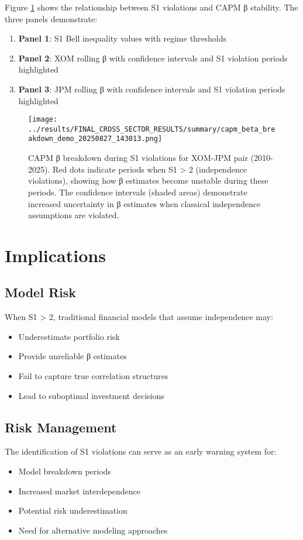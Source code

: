 \documentclass[11pt,a4paper]{article}
\begin{document}
Figure \ref{fig:capm_breakdown} shows the relationship between S1 violations and CAPM β stability. The three panels demonstrate:

\begin{enumerate}
\item \textbf{Panel 1}: S1 Bell inequality values with regime thresholds
\item \textbf{Panel 2}: XOM rolling β with confidence intervals and S1 violation periods highlighted
\item \textbf{Panel 3}: JPM rolling β with confidence intervals and S1 violation periods highlighted
\end{enumerate}

\begin{figure}[H]
\centering
\texttt{[image: ../results/FINAL\_CROSS\_SECTOR\_RESULTS/summary/capm\_beta\_breakdown\_demo\_20250827\_143013.png]}
\caption{CAPM β breakdown during S1 violations for XOM-JPM pair (2010-2025). Red dots indicate periods when S1 > 2 (independence violations), showing how β estimates become unstable during these periods. The confidence intervals (shaded areas) demonstrate increased uncertainty in β estimates when classical independence assumptions are violated.}
\label{fig:capm_breakdown}
\end{figure}

\section{Implications}

\subsection{Model Risk}
When S1 > 2, traditional financial models that assume independence may:
\begin{itemize}
\item Underestimate portfolio risk
\item Provide unreliable β estimates
\item Fail to capture true correlation structures
\item Lead to suboptimal investment decisions
\end{itemize}

\subsection{Risk Management}
The identification of S1 violations can serve as an early warning system for:
\begin{itemize}
\item Model breakdown periods
\item Increased market interdependence
\item Potential risk underestimation
\item Need for alternative modeling approaches
\end{itemize}
\end{document}

